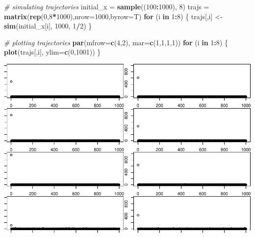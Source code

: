 \documentclass[]{article}
\newenvironment{Shaded}{\begin{snugshade}}{\end{snugshade}}
\newcommand{\CommentTok}[1]{\textcolor[rgb]{0.56,0.35,0.01}{\textit{#1}}}
\newcommand{\ControlFlowTok}[1]{\textcolor[rgb]{0.13,0.29,0.53}{\textbf{#1}}}
\newcommand{\DataTypeTok}[1]{\textcolor[rgb]{0.13,0.29,0.53}{#1}}
\newcommand{\DecValTok}[1]{\textcolor[rgb]{0.00,0.00,0.81}{#1}}
\newcommand{\KeywordTok}[1]{\textcolor[rgb]{0.13,0.29,0.53}{\textbf{#1}}}
\newcommand{\NormalTok}[1]{#1}
\newcommand{\OperatorTok}[1]{\textcolor[rgb]{0.81,0.36,0.00}{\textbf{#1}}}
\newcommand{\StringTok}[1]{\textcolor[rgb]{0.31,0.60,0.02}{#1}}
\begin{document}
\begin{Shaded}
\begin{Highlighting}[]
\CommentTok{# simulating trajectories}
\NormalTok{initial_x =}\StringTok{ }\KeywordTok{sample}\NormalTok{((}\DecValTok{100}\OperatorTok{:}\DecValTok{1000}\NormalTok{), }\DecValTok{8}\NormalTok{)}
\NormalTok{trajs =}\StringTok{ }\KeywordTok{matrix}\NormalTok{(}\KeywordTok{rep}\NormalTok{(}\DecValTok{0}\NormalTok{,}\DecValTok{8}\OperatorTok{*}\DecValTok{1000}\NormalTok{),}\DataTypeTok{nrow=}\DecValTok{1000}\NormalTok{,}\DataTypeTok{byrow=}\NormalTok{T)}
\ControlFlowTok{for}\NormalTok{ (i }\ControlFlowTok{in} \DecValTok{1}\OperatorTok{:}\DecValTok{8}\NormalTok{) \{}
\NormalTok{    trajs[,i] <-}\StringTok{ }\KeywordTok{sim}\NormalTok{(initial_x[i], }\DecValTok{1000}\NormalTok{, }\DecValTok{1}\OperatorTok{/}\DecValTok{2}\NormalTok{)}
\NormalTok{\}}
\end{Highlighting}
\end{Shaded}

\begin{Shaded}
\begin{Highlighting}[]
\CommentTok{# plotting trajectories}
\KeywordTok{par}\NormalTok{(}\DataTypeTok{mfrow=}\KeywordTok{c}\NormalTok{(}\DecValTok{4}\NormalTok{,}\DecValTok{2}\NormalTok{), }\DataTypeTok{mar=}\KeywordTok{c}\NormalTok{(}\DecValTok{1}\NormalTok{,}\DecValTok{1}\NormalTok{,}\DecValTok{1}\NormalTok{,}\DecValTok{1}\NormalTok{))}
\ControlFlowTok{for}\NormalTok{ (i }\ControlFlowTok{in} \DecValTok{1}\OperatorTok{:}\DecValTok{8}\NormalTok{) \{}
    \KeywordTok{plot}\NormalTok{(trajs[,i], }\DataTypeTok{ylim=}\KeywordTok{c}\NormalTok{(}\DecValTok{0}\NormalTok{,}\DecValTok{1001}\NormalTok{))}
\NormalTok{\}}
\end{Highlighting}
\end{Shaded}

\includegraphics{./figures/unnamed-chunk-15-1.pdf}
\end{document}
